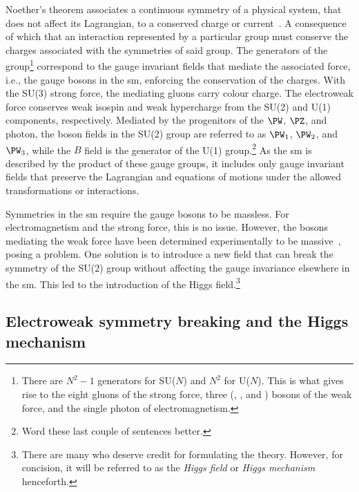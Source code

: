 Noether's theorem associates a continuous symmetry of a physical system, that does not affect its Lagrangian, to a conserved charge or current~\cite{Noether_1971}. A consequence of which that an interaction represented by a particular group must conserve the charges associated with the symmetries of said group. The generators of the group\footnote{There are $N^2 - \text{1}$ generators for SU($N$) and $N^2$ for U($N$). This is what gives rise to the eight gluons of the strong force, three (\PWplus, \PWminus, and \PZ) bosons of the weak force, and the single photon of electromagnetism.} correspond to the gauge invariant fields that mediate the associated force, i.e., the gauge bosons in the \acrshort{sm}, enforcing the conservation of the charges. With the SU(3) strong force, the mediating gluons carry colour charge. The electroweak force conserves weak isospin and weak hypercharge from the SU(2) and U(1) components, respectively. Mediated by the progenitors of the $\PW$, $\PZ$, and photon, the boson fields in the SU(2) group are referred to as $\PW_1$, $\PW_2$, and $\PW_3$, while the $B$ field is the generator of the U(1) group.\footnote{Word these last couple of sentences better.} As the \acrshort{sm} is described by the product of these gauge groups, it includes only gauge invariant fields that preserve the Lagrangian and equations of motions under the allowed transformations or interactions.

Symmetries in the \acrlong{sm} require the gauge bosons to be massless. For electromagnetism and the strong force, this is no issue. However, the bosons mediating the weak force have been determined experimentally to be massive~\cite{Arnison:1983mk,Bagnaia:1983zx}, posing a problem. One solution is to introduce a new field that can break the symmetry of the SU(2) group without affecting the gauge invariance elsewhere in the \acrshort{sm}. This led to the introduction of the Higgs field.\footnote{There are many who deserve credit for formulating the theory. However, for concision, it will be referred to as the \emph{Higgs field} or \emph{Higgs mechanism} henceforth.}





\subsection{Electroweak symmetry breaking and the Higgs mechanism}
\label{subsec:theory_higgs_mechanism}

